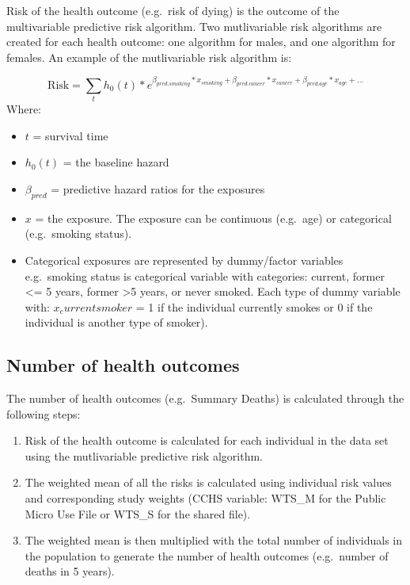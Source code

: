 \documentclass[]{book}
\providecommand{\tightlist}{%
  \setlength{\itemsep}{0pt}\setlength{\parskip}{0pt}}
\begin{document}
Risk of the health outcome (e.g.~risk of dying) is the outcome of the
multivariable predictive risk algorithm. Two mutlivariable risk
algorithms are created for each health outcome: one algorithm for males,
and one algorithm for females. An example of the mutlivariable risk
algorithm is:

\[ \text{Risk} = \sum_t h_0(t) * e^{\beta_{pred.smoking}*x_{smoking}+\beta_{pred.cancer}*x_{cancer} + \beta_{pred.age}*x_{age} +...}  \]
Where:

\begin{itemize}
\item
  \(t\) = survival time
\item
  \(h_0(t)\) = the baseline hazard
\item
  \(\beta_{pred}\) = predictive hazard ratios for the exposures
\item
  \(x\) = the exposure. The exposure can be continuous (e.g.~age) or
  categorical (e.g.~smoking status).
\item
  Categorical exposures are represented by dummy/factor variables
  e.g.~smoking status is categorical variable with categories: current,
  former \textless{}= 5 years, former \textgreater{}5 years, or never
  smoked. Each type of dummy variable with: \(x_current smoker\) = 1 if
  the individual currently smokes or 0 if the individual is another type
  of smoker).
\end{itemize}

\subsection{Number of health outcomes}\label{number-of-health-outcomes}

The number of health outcomes (e.g.~Summary Deaths) is calculated
through the following steps:

\begin{enumerate}
\def\labelenumi{\arabic{enumi}.}
\tightlist
\item
  Risk of the health outcome is calculated for each individual in the
  data set using the mutlivariable predictive risk algorithm.
\item
  The weighted mean of all the risks is calculated using individual risk
  values and corresponding study weights (CCHS variable: WTS\_M for the
  Public Micro Use File or WTS\_S for the shared file).
\item
  The weighted mean is then multiplied with the total number of
  individuals in the population to generate the number of health
  outcomes (e.g.~number of deaths in 5 years).
\end{enumerate}
\end{document}
